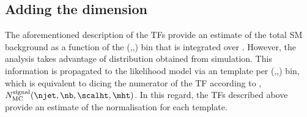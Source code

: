 


\subsection{Adding the \mht dimension}

The aforementioned description of the TFs provide an estimate of the
total SM background as a function of the (\njet,\nb,\HT) bin that is
integrated over \mht. However, the analysis takes advantage of \mht
distribution obtained from simulation. This information is propagated
to the likelihood model via an \mht template per (\njet,\nb,\HT) bin,
which is equivalent to dicing the numerator of the TF according to
\mht, \ie $N_{\rm MC}^{\rm signal}(\njet,\nb,\scalht,\mht)$. In this
regard, the TFs described above provide an estimate of the
normalisation for each \mht template.

%


